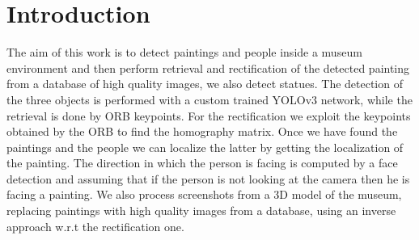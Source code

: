 \section{Introduction}
The aim of this work is to detect paintings and people inside a museum environment and then perform retrieval and rectification of the detected painting from a database of high quality images, we also detect statues. The detection of the three objects is performed with a custom trained YOLOv3 network, while the retrieval is done by ORB keypoints. For the rectification we exploit the keypoints obtained by the ORB to find the homography matrix. Once we have found the paintings and the people we can localize the latter by getting the localization of the painting. The direction in which the person is facing is computed by a face detection and assuming that if the person is not looking at the camera then he is facing a painting.
We also process screenshots from a 3D model of the museum, replacing paintings with high quality images from a database, using an inverse approach w.r.t the rectification one.
